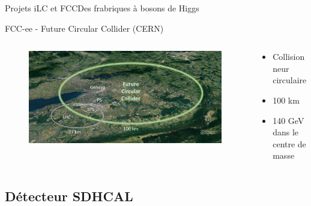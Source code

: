 \documentclass[9pt]{beamer}
\begin{document}
\begin{frame}{Projets iLC et FCC}{Des frabriques à bosons de Higgs}
\begin{block}{FCC-ee - Future Circular Collider (CERN)}
\begin{columns}
            \begin{column}{0.45\textwidth}
                \begin{figure}
                    \includegraphics[width=\textwidth]{../img/FCC.jpg}
                \end{figure}
            \end{column}
            
            \begin{column}{0.45\textwidth}
                \begin{itemize}
                    \item Collisionneur circulaire
                    \item 100 km
                    \item 140 GeV dans le centre de masse
                \end{itemize}
            \end{column}
            
        \end{columns}
    \end{block}
    
\end{frame}


\subsection{Détecteur SDHCAL}
\end{document}
